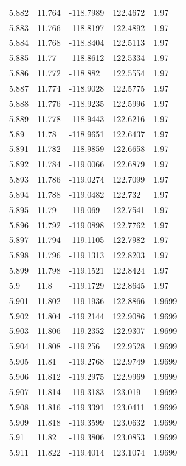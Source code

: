 \begin{tabular}{lllll}
5.882 & 11.764 & -118.7989 & 122.4672 & 1.97 \\
5.883 & 11.766 & -118.8197 & 122.4892 & 1.97 \\
5.884 & 11.768 & -118.8404 & 122.5113 & 1.97 \\
5.885 & 11.77 & -118.8612 & 122.5334 & 1.97 \\
5.886 & 11.772 & -118.882 & 122.5554 & 1.97 \\
5.887 & 11.774 & -118.9028 & 122.5775 & 1.97 \\
5.888 & 11.776 & -118.9235 & 122.5996 & 1.97 \\
5.889 & 11.778 & -118.9443 & 122.6216 & 1.97 \\
5.89 & 11.78 & -118.9651 & 122.6437 & 1.97 \\
5.891 & 11.782 & -118.9859 & 122.6658 & 1.97 \\
5.892 & 11.784 & -119.0066 & 122.6879 & 1.97 \\
5.893 & 11.786 & -119.0274 & 122.7099 & 1.97 \\
5.894 & 11.788 & -119.0482 & 122.732 & 1.97 \\
5.895 & 11.79 & -119.069 & 122.7541 & 1.97 \\
5.896 & 11.792 & -119.0898 & 122.7762 & 1.97 \\
5.897 & 11.794 & -119.1105 & 122.7982 & 1.97 \\
5.898 & 11.796 & -119.1313 & 122.8203 & 1.97 \\
5.899 & 11.798 & -119.1521 & 122.8424 & 1.97 \\
5.9 & 11.8 & -119.1729 & 122.8645 & 1.97 \\
5.901 & 11.802 & -119.1936 & 122.8866 & 1.9699 \\
5.902 & 11.804 & -119.2144 & 122.9086 & 1.9699 \\
5.903 & 11.806 & -119.2352 & 122.9307 & 1.9699 \\
5.904 & 11.808 & -119.256 & 122.9528 & 1.9699 \\
5.905 & 11.81 & -119.2768 & 122.9749 & 1.9699 \\
5.906 & 11.812 & -119.2975 & 122.9969 & 1.9699 \\
5.907 & 11.814 & -119.3183 & 123.019 & 1.9699 \\
5.908 & 11.816 & -119.3391 & 123.0411 & 1.9699 \\
5.909 & 11.818 & -119.3599 & 123.0632 & 1.9699 \\
5.91 & 11.82 & -119.3806 & 123.0853 & 1.9699 \\
5.911 & 11.822 & -119.4014 & 123.1074 & 1.9699 \\

\end{tabular}
